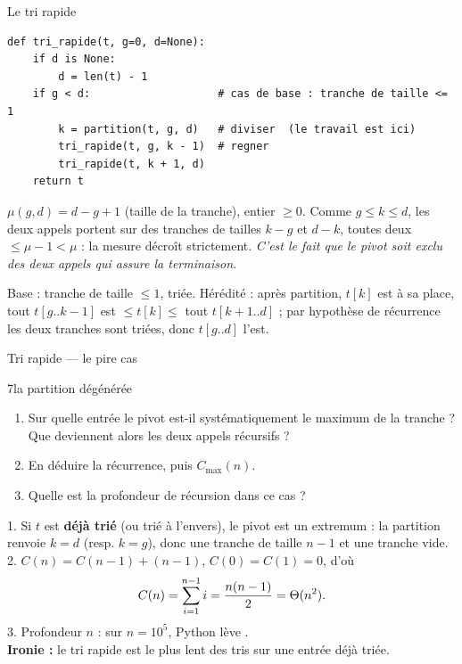\documentclass[11pt,aspectratio=169]{beamer}
\begin{document}
\begin{frame}[fragile,shrink=15]{Le tri rapide}
\begin{lstlisting}
def tri_rapide(t, g=0, d=None):
    if d is None:
        d = len(t) - 1
    if g < d:                    # cas de base : tranche de taille <= 1
        k = partition(t, g, d)   # diviser  (le travail est ici)
        tri_rapide(t, g, k - 1)  # regner
        tri_rapide(t, k + 1, d)
    return t
\end{lstlisting}
\begin{terminaisonrec}
$\mu(g,d)=d-g+1$ (taille de la tranche), entier $\ge0$. Comme $g\le k\le d$, les deux
appels portent sur des tranches de tailles $k-g$ et $d-k$, toutes deux
$\le \mu-1<\mu$ : la mesure décroît strictement. \emph{C'est le fait que le pivot soit
exclu des deux appels qui assure la terminaison.}
\end{terminaisonrec}
\begin{correction}
\small
Base : tranche de taille $\le1$, triée. Hérédité : après partition, $t[k]$ est à sa place,
tout $t[g..k-1]$ est $\le t[k]\le$ tout $t[k+1..d]$ ; par hypothèse de récurrence les deux
tranches sont triées, donc $t[g..d]$ l'est.
\end{correction}
\end{frame}

\begin{frame}[shrink=15]{Tri rapide --- le pire cas}
\begin{exercice}{7}{la partition dégénérée}
\begin{enumerate}\setlength\itemsep{1pt}
  \item Sur quelle entrée le pivot  est-il systématiquement le maximum de la
        tranche ? Que deviennent alors les deux appels récursifs ?
  \item En déduire la récurrence, puis $C_{\max}(n)$.
  \item Quelle est la profondeur de récursion dans ce cas ?
\end{enumerate}
\end{exercice}
\pause
\begin{soluce}\small
1. Si $t$ est \textbf{déjà trié} (ou trié à l'envers), le pivot est un extremum :
la partition renvoie $k=d$ (resp. $k=g$), donc une tranche de taille $n-1$ et une tranche vide.\\[2pt]
2. $C(n)=C(n-1)+(n-1)$, $C(0)=C(1)=0$, d'où
\[
C(n)=\sum_{i=1}^{n-1} i=\frac{n(n-1)}2=\Theta(n^2).
\]
3. Profondeur $n$ : sur $n=10^5$, Python lève .\\[2pt]
\textbf{Ironie :} le tri rapide est le plus lent des tris sur une entrée déjà triée.
\end{soluce}
\end{frame}
\end{document}
